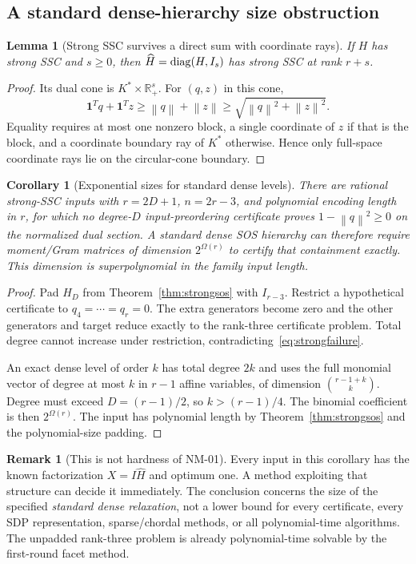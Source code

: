 \documentclass[11pt]{article}
\newtheorem{lemma}[theorem]{Lemma}
\newtheorem{corollary}[theorem]{Corollary}
\theoremstyle{definition}\newtheorem{definition}[theorem]{Definition}
\newtheorem{remark}[theorem]{Remark}
\newcommand{\R}{\mathbb R}\newcommand{\Q}{\mathbb Q}\newcommand{\Z}{\mathbb Z}
\newcommand{\e}{\mathbf1}\newcommand{\cone}{\operatorname{cone}}
\newcommand{\norm}[1]{\left\lVert#1\right\rVert}\newcommand{\Tr}{\mathcal T}
\begin{document}
\subsection{A standard dense-hierarchy size obstruction}
\begin{lemma}[Strong SSC survives a direct sum with coordinate rays]
If $H$ has strong SSC and $s\ge0$, then $\widehat H=\operatorname{diag}(H,I_s)$ has strong SSC at rank $r+s$.
\end{lemma}
\begin{proof}
Its dual cone is $K^*\times\R_+^s$. For $(q,z)$ in this cone,
\[
 \e^Tq+\e^Tz\ge\norm{q}+\norm{z}
 \ge\sqrt{\norm{q}^2+\norm{z}^2}.
\]
Equality requires at most one nonzero block, a single coordinate of $z$ if that is the block, and a coordinate boundary ray of $K^*$ otherwise. Hence only full-space coordinate rays lie on the circular-cone boundary.
\end{proof}

\begin{corollary}[Exponential sizes for standard dense levels]
\label{cor:dense}
There are rational strong-SSC inputs with $r=2D+1$, $n=2r-3$, and polynomial encoding length in $r$, for which no degree-$D$ input-preordering certificate proves $1-\norm{q}^2\ge0$ on the normalized dual section. A standard dense SOS hierarchy can therefore require moment/Gram matrices of dimension $2^{\Omega(r)}$ to certify that containment exactly. This dimension is superpolynomial in the family input length.
\end{corollary}
\begin{proof}
Pad $H_D$ from Theorem~\ref{thm:strongsos} with $I_{r-3}$. Restrict a hypothetical certificate to $q_4=\cdots=q_r=0$. The extra generators become zero and the other generators and target reduce exactly to the rank-three certificate problem. Total degree cannot increase under restriction, contradicting~\eqref{eq:strongfailure}.

An exact dense level of order $k$ has total degree $2k$ and uses the full monomial vector of degree at most $k$ in $r-1$ affine variables, of dimension $\binom{r-1+k}{k}$. Degree must exceed $D=(r-1)/2$, so $k>(r-1)/4$. The binomial coefficient is then $2^{\Omega(r)}$. The input has polynomial length by Theorem~\ref{thm:strongsos} and the polynomial-size padding.
\end{proof}

\begin{remark}[This is not hardness of NM-01]
Every input in this corollary has the known factorization $X=I\widehat H$ and optimum one. A method exploiting that structure can decide it immediately. The conclusion concerns the size of the specified \emph{standard dense relaxation}, not a lower bound for every certificate, every SDP representation, sparse/chordal methods, or all polynomial-time algorithms. The unpadded rank-three problem is already polynomial-time solvable by the first-round facet method.
\end{remark}
\end{document}
